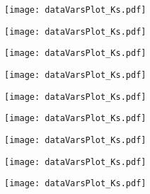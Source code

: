 \begin{figure}[H]
\begin{subfigure}{0.5\linewidth}
	\texttt{[image: dataVarsPlot\_Ks.pdf]}
\end{subfigure}
\begin{subfigure}{0.5\linewidth}
	\texttt{[image: dataVarsPlot\_Ks.pdf]}
\end{subfigure}
\begin{subfigure}{0.5\linewidth}
	\texttt{[image: dataVarsPlot\_Ks.pdf]}
\end{subfigure}
\begin{subfigure}{0.5\linewidth}
	\texttt{[image: dataVarsPlot\_Ks.pdf]}
\end{subfigure}
\begin{subfigure}{0.5\linewidth}
	\texttt{[image: dataVarsPlot\_Ks.pdf]}
\end{subfigure}
\begin{subfigure}{0.5\linewidth}
	\texttt{[image: dataVarsPlot\_Ks.pdf]}
\end{subfigure}
\begin{subfigure}{0.5\linewidth}
	\texttt{[image: dataVarsPlot\_Ks.pdf]}
\end{subfigure}
\begin{subfigure}{0.5\linewidth}
	\texttt{[image: dataVarsPlot\_Ks.pdf]}
\end{subfigure}
\begin{subfigure}{0.5\linewidth}
	\texttt{[image: dataVarsPlot\_Ks.pdf]}
\end{subfigure}
	
\end{figure}